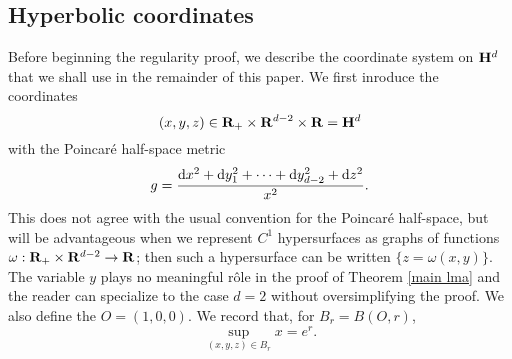 
\subsection{Hyperbolic coordinates}
Before beginning the regularity proof, we describe the coordinate system on $\mathbf H^d$ that we shall use in the remainder of this paper. We first inroduce the coordinates
$$(x, y, z) \in \mathbf{R}_+ \times \mathbf{R}^{d - 2} \times \mathbf{R} = \mathbf H^d$$
with the Poincar\'e half-space metric
\begin{equation}\label{hyperbolic metric}
g = \frac{\mathop{}\!\mathrm{d} x^2 + \mathop{}\!\mathrm{d} y_1^2 + \cdots + \mathop{}\!\mathrm{d} y_{d - 2}^2 + \mathop{}\!\mathrm{d} z^2}{x^2}.
\end{equation}
This does not agree with the usual convention for the Poincar\'e half-space, but will be advantageous when we represent $C^1$ hypersurfaces as graphs of functions $\omega: \mathbf{R}_+ \times \mathbf{R}^{d - 2} \to \mathbf{R}$; then such a hypersurface can be written $\{z = \omega(x, y)\}$.
The variable $y$ plays no meaningful r\^ole in the proof of Theorem \ref{main lma} and the reader can specialize to the case $d = 2$ without oversimplifying the proof.
We also define the  $O = (1, 0, 0)$.
We record that, for $B_r = B(O, r)$,
\begin{equation}\label{sup in a ball}
\sup_{(x, y, z) \in B_r} x = e^r.
\end{equation}


